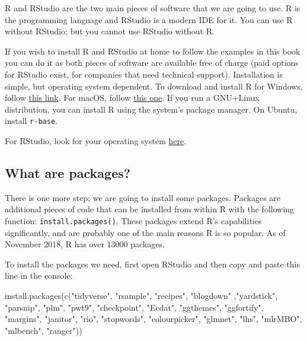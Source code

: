 \documentclass[
]{article}
\newenvironment{Shaded}{\begin{snugshade}}{\end{snugshade}}
\newcommand{\FunctionTok}[1]{\textcolor[rgb]{0.00,0.00,0.00}{#1}}
\newcommand{\NormalTok}[1]{#1}
\newcommand{\StringTok}[1]{\textcolor[rgb]{0.31,0.60,0.02}{#1}}
\begin{document}
R and RStudio are the two main pieces of software that we are going to use. R is the programming
language and RStudio is a modern IDE for it. You can use R without RStudio; but you cannot use
RStudio without R.

If you wish to install R and RStudio at home to follow the examples in this book you can do it as
both pieces of software are available free of charge (paid options for RStudio exist, for companies
that need technical support). Installation is simple, but operating system dependent. To download
and install R for Windows, follow \href{https://cloud.r-project.org/bin/windows/base/}{this link}.
For macOS, follow \href{https://cloud.r-project.org/bin/macosx/}{this one}. If you run a GNU+Linux
distribution, you can install R using the system's package manager. On Ubuntu, install \texttt{r-base}.

For RStudio, look for your operating system \href{https://www.rstudio.com/products/rstudio/download/\#download}{here}.

\hypertarget{what-are-packages}{%
\subsection*{What are packages?}\label{what-are-packages}}

There is one more step; we are going to install some packages. Packages are additional pieces of
code that can be installed from within R with the following function: \texttt{install.packages()}. These
packages extend R's capabilities significantly, and are probably one of the main reasons R is so
popular. As of November 2018, R has over 13000 packages.

To install the packages we need, first open RStudio and then copy and paste this line in the console:

\begin{Shaded}
\begin{Highlighting}[]
\FunctionTok{install.packages}\NormalTok{(}\FunctionTok{c}\NormalTok{(}\StringTok{"tidyverse"}\NormalTok{, }\StringTok{"rsample"}\NormalTok{, }\StringTok{"recipes"}\NormalTok{, }\StringTok{"blogdown"}\NormalTok{ ,}\StringTok{"yardstick"}\NormalTok{, }\StringTok{"parsnip"}\NormalTok{, }\StringTok{"plm"}\NormalTok{, }\StringTok{"pwt9"}\NormalTok{, }
                   \StringTok{"checkpoint"}\NormalTok{, }\StringTok{"Ecdat"}\NormalTok{, }\StringTok{"ggthemes"}\NormalTok{, }\StringTok{"ggfortify"}\NormalTok{, }\StringTok{"margins"}\NormalTok{, }\StringTok{"janitor"}\NormalTok{, }\StringTok{"rio"}\NormalTok{, }\StringTok{"stopwords"}\NormalTok{,}
                   \StringTok{"colourpicker"}\NormalTok{, }\StringTok{"glmnet"}\NormalTok{, }\StringTok{"lhs"}\NormalTok{, }\StringTok{"mlrMBO"}\NormalTok{, }\StringTok{"mlbench"}\NormalTok{, }\StringTok{"ranger"}\NormalTok{))}
\end{Highlighting}
\end{Shaded}
\end{document}
